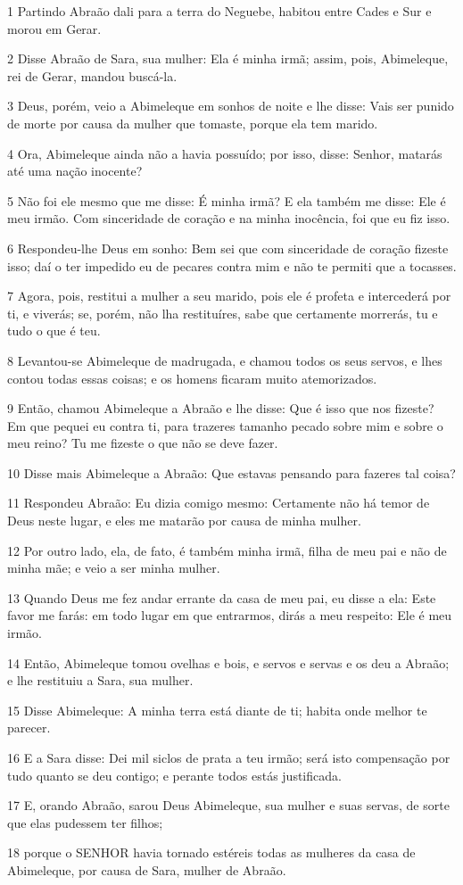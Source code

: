 \par 1 Partindo Abraão dali para a terra do Neguebe, habitou entre Cades e Sur e morou em Gerar.
\par 2 Disse Abraão de Sara, sua mulher: Ela é minha irmã; assim, pois, Abimeleque, rei de Gerar, mandou buscá-la.
\par 3 Deus, porém, veio a Abimeleque em sonhos de noite e lhe disse: Vais ser punido de morte por causa da mulher que tomaste, porque ela tem marido.
\par 4 Ora, Abimeleque ainda não a havia possuído; por isso, disse: Senhor, matarás até uma nação inocente?
\par 5 Não foi ele mesmo que me disse: É minha irmã? E ela também me disse: Ele é meu irmão. Com sinceridade de coração e na minha inocência, foi que eu fiz isso.
\par 6 Respondeu-lhe Deus em sonho: Bem sei que com sinceridade de coração fizeste isso; daí o ter impedido eu de pecares contra mim e não te permiti que a tocasses.
\par 7 Agora, pois, restitui a mulher a seu marido, pois ele é profeta e intercederá por ti, e viverás; se, porém, não lha restituíres, sabe que certamente morrerás, tu e tudo o que é teu.
\par 8 Levantou-se Abimeleque de madrugada, e chamou todos os seus servos, e lhes contou todas essas coisas; e os homens ficaram muito atemorizados.
\par 9 Então, chamou Abimeleque a Abraão e lhe disse: Que é isso que nos fizeste? Em que pequei eu contra ti, para trazeres tamanho pecado sobre mim e sobre o meu reino? Tu me fizeste o que não se deve fazer.
\par 10 Disse mais Abimeleque a Abraão: Que estavas pensando para fazeres tal coisa?
\par 11 Respondeu Abraão: Eu dizia comigo mesmo: Certamente não há temor de Deus neste lugar, e eles me matarão por causa de minha mulher.
\par 12 Por outro lado, ela, de fato, é também minha irmã, filha de meu pai e não de minha mãe; e veio a ser minha mulher.
\par 13 Quando Deus me fez andar errante da casa de meu pai, eu disse a ela: Este favor me farás: em todo lugar em que entrarmos, dirás a meu respeito: Ele é meu irmão.
\par 14 Então, Abimeleque tomou ovelhas e bois, e servos e servas e os deu a Abraão; e lhe restituiu a Sara, sua mulher.
\par 15 Disse Abimeleque: A minha terra está diante de ti; habita onde melhor te parecer.
\par 16 E a Sara disse: Dei mil siclos de prata a teu irmão; será isto compensação por tudo quanto se deu contigo; e perante todos estás justificada.
\par 17 E, orando Abraão, sarou Deus Abimeleque, sua mulher e suas servas, de sorte que elas pudessem ter filhos;
\par 18 porque o SENHOR havia tornado estéreis todas as mulheres da casa de Abimeleque, por causa de Sara, mulher de Abraão.

